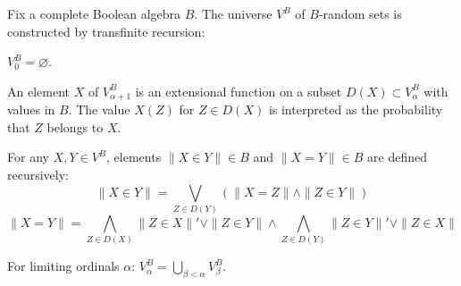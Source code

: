 Fix a complete Boolean algebra $B$. The universe $V^B$ of $B$-random sets is constructed by transfinite recursion:

$V_0^B = \varnothing$.

An element $X$ of $V_{\alpha+1}^B$ is an extensional function on a subset $D(X) \subset V_\alpha^B$ with values in $B$. The value $X(Z)$ for $Z \in D(X)$ is interpreted as the probability that $Z$ belongs to $X$.

For any $X, Y \in V^B$, elements $\|X \in Y\| \in B$ and $\|X = Y\| \in B$ are defined recursively:
$$\|X \in Y\| = \bigvee_{Z \in D(Y)} (\|X = Z\| \wedge \|Z \in Y\|)$$
$$\|X = Y\| = \bigwedge_{Z \in D(X)} \|Z \in X\|' \vee \|Z \in Y\| \wedge \bigwedge_{Z \in D(Y)} \|Z \in Y\|' \vee \|Z \in X\|$$

For limiting ordinals $\alpha$: $V_\alpha^B = \bigcup_{\beta < \alpha} V_\beta^B$.